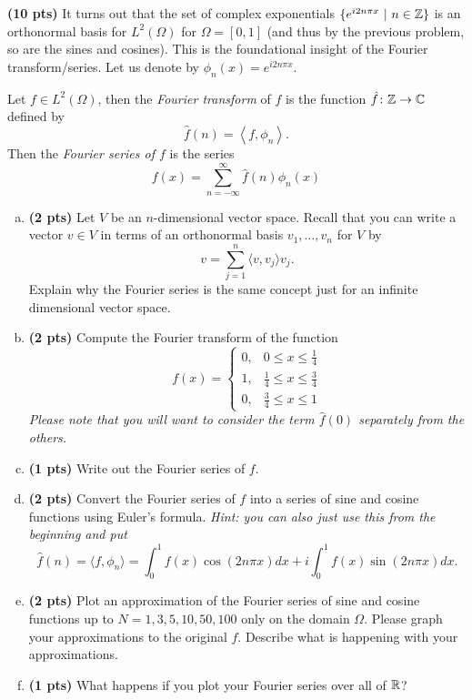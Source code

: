 \documentclass[12pt]{article} %
\newcommand{\innprod}[2]{\left\langle #1, #2\right\rangle}
\begin{document}
\newpage
\begin{problem}
\textbf{(10 pts)} It turns out that the set of complex exponentials $\{e^{i2n\pi x} ~|~ n\in \mathbb{Z}\}$ is an orthonormal basis for $L^2(\Omega)$ for $\Omega = [0,1]$ (and thus by the previous problem, so are the sines and cosines). This is the foundational insight of the Fourier transform/series. Let us denote by $\phi_n(x) = e^{i2n\pi x}$.

Let $f \in L^2(\Omega)$, then the \emph{Fourier transform} of $f$ is the function $\hat{f} \colon \mathbb{Z} \to \mathbb{C}$ defined by
\[
\hat{f}(n) = \innprod{f}{\phi_n}.
\]
Then the \emph{Fourier series of $f$} is the series
\[
f(x) = \sum_{n=-\infty}^\infty \hat{f}(n) \phi_n(x)
\]
\begin{enumerate}[(a)]
\item \textbf{(2 pts)} Let $V$ be an $n$-dimensional vector space. Recall that you can write a vector $v \in V$ in terms of an orthonormal basis $v_1,\dots,v_n$ for $V$ by
\[
v = \sum_{j=1}^n \langle v,v_j\rangle v_j.
\]
Explain why the Fourier series is the same concept just for an infinite dimensional vector space.
\item \textbf{(2 pts)} Compute the Fourier transform of the function 
\[
f(x) = \begin{cases} 0, & 0\leq x \leq \frac{1}{4} \\
	1, &  \frac{1}{4} \leq x \leq \frac{3}{4} \\
 0, & \frac{3}{4}\leq x \leq 1 \end{cases}
\]
\emph{Please note that you will want to consider the term $\hat{f}(0)$ separately from the others.}
\item \textbf{(1 pts)} Write out the Fourier series of $f$. 
\item \textbf{(2 pts)} Convert the Fourier series of $f$ into a series of sine and cosine functions using Euler's formula. \emph{Hint: you can also just use this from the beginning and put}
\[
\hat{f}(n) = \langle f,\phi_n\rangle = \int_0^1 f(x)\cos(2n\pi x) dx + i \int_0^1 f(x)\sin(2n\pi x)dx.
\]
\item \textbf{(2 pts)} Plot an approximation of the Fourier series of sine and cosine functions up to $N=1,3,5,10,50,100$ only on the domain $\Omega$. Please graph your approximations to the original $f$. Describe what is happening with your approximations.
\item \textbf{(1 pts)} What happens if you plot your Fourier series over all of $\mathbb{R}$?
\end{enumerate}
\end{problem}
\end{document}
